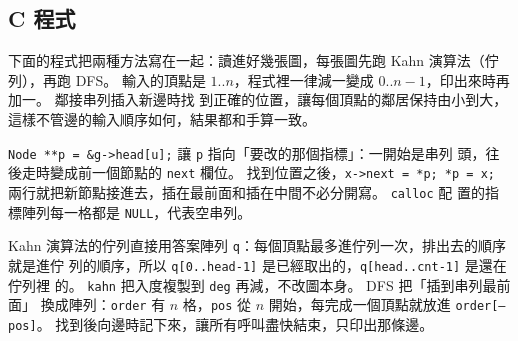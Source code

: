 \subsection{C 程式}

下面的程式把兩種方法寫在一起：讀進好幾張圖，每張圖先跑 Kahn 演算法（佇列），再跑 DFS。
輸入的頂點是 $1..n$，程式裡一律減一變成 $0..n-1$，印出來時再加一。 鄰接串列插入新邊時找
到正確的位置，讓每個頂點的鄰居保持由小到大，這樣不管邊的輸入順序如何，結果都和手算一致。

\begin{cbookrecap}[第~14~章 14.5 節、第~19~章 19.3、19.10 節]
\texttt{Node **p = \&g->head[u];} 讓 \texttt{p} 指向「要改的那個指標」：一開始是串列
頭，往後走時變成前一個節點的 \texttt{next} 欄位。 找到位置之後，\texttt{x->next = *p;
*p = x;} 兩行就把新節點接進去，插在最前面和插在中間不必分開寫。 \texttt{calloc} 配
置的指標陣列每一格都是 \texttt{NULL}，代表空串列。
\end{cbookrecap}

Kahn 演算法的佇列直接用答案陣列 \texttt{q}：每個頂點最多進佇列一次，排出去的順序就是進佇
列的順序，所以 \texttt{q[0..head-1]} 是已經取出的，\texttt{q[head..cnt-1]} 是還在佇列裡
的。 \texttt{kahn} 把入度複製到 \texttt{deg} 再減，不改圖本身。 DFS 把「插到串列最前面」
換成陣列：\texttt{order} 有 $n$ 格，\texttt{pos} 從 $n$ 開始，每完成一個頂點就放進
\texttt{order[--pos]}。 找到後向邊時記下來，讓所有呼叫盡快結束，只印出那條邊。

